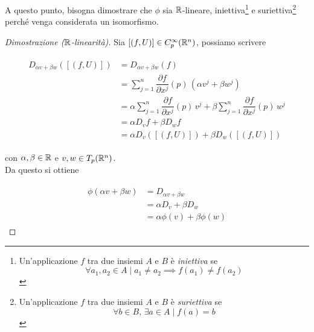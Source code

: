 A questo punto, bisogna dimostrare che $ \phi $ sia $ \mathbb{R} $-lineare, iniettiva\footnote{%
	Un'applicazione $ f $ tra due insiemi $ A $ e $ B $ è \textit{iniettiva} se
	\begin{equation}
		\forall a_{1},a_{2} \in A \mid a_{1} \neq a_{2} \implies f(a_{1}) \neq f(a_{2})
	\end{equation}%
} e suriettiva\footnote{%
	Un'applicazione $ f $ tra due insiemi $ A $ e $ B $ è \textit{suriettiva} se
	\begin{equation}
		\forall b \in B, \, \exists a \in A \mid f(a) = b
	\end{equation}%
} perché venga considerata un isomorfismo.

\begin{proof}[Dimostrazione ($ \mathbb{R} $-linearità)]
	Sia $ [(f,U)] \in C_{p}^{\infty}(\mathbb{R}^{n}) $, possiamo scrivere
	
	\begin{align}
		\begin{split}
			D_{\alpha v + \beta w} ([(f,U)]) &= D_{\alpha v + \beta w} (f)\\
			&= \sum_{j=1}^{n} \dfrac{\partial f}{\partial x^{j}} (p) \, (\alpha v^{j} + \beta w^{j})\\
			&= \alpha \sum_{j=1}^{n} \dfrac{\partial f}{\partial x^{j}} (p) \, v^{j} + \beta \sum_{j=1}^{n} \dfrac{\partial f}{\partial x^{j}} (p) \, w^{j}\\
			&= \alpha D_{v} f + \beta D_{w} f\\
			&= \alpha D_{v} ([(f,U)]) + \beta D_{w} ([(f,U)])
		\end{split}
	\end{align}

	con $ \alpha,\beta \in \mathbb{R} $ e $ v,w \in T_{p}(\mathbb{R}^{n}) $.\\
	Da questo si ottiene
	
	\begin{align}
		\begin{split}
			\phi (\alpha v + \beta w) &= D_{\alpha v + \beta w}\\
			&= \alpha D_{v} + \beta D_{w}\\
			&= \alpha \phi (v) + \beta \phi (w)
		\end{split}
	\end{align}
\end{proof}


